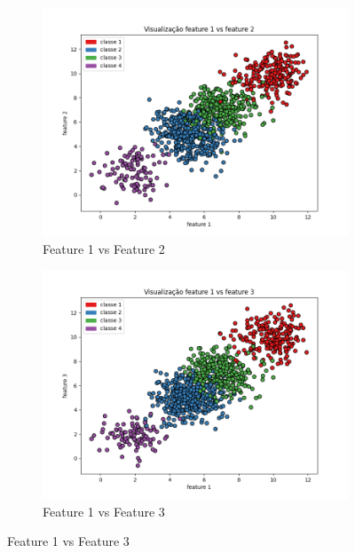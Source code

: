\begin{enumerate}
\begin{figure}[H]
    \centering
    \begin{subfigure}{0.45\textwidth}
        \includegraphics[width=\textwidth]{fig/q1_i1_x1x2.png}
        \caption{Feature 1 vs Feature 2}
        \label{fig:q1_i1_x1x2}
    \end{subfigure}
    \hfill
    \begin{subfigure}{0.45\textwidth}
        \includegraphics[width=\textwidth]{fig/q1_i1_x1x3.png}
        \caption{Feature 1 vs Feature 3}
        \label{fig:q1_i1_x1x3}
    \end{subfigure}
    
    \vspace{0.5cm}
    

\end{figure}
\end{enumerate}
